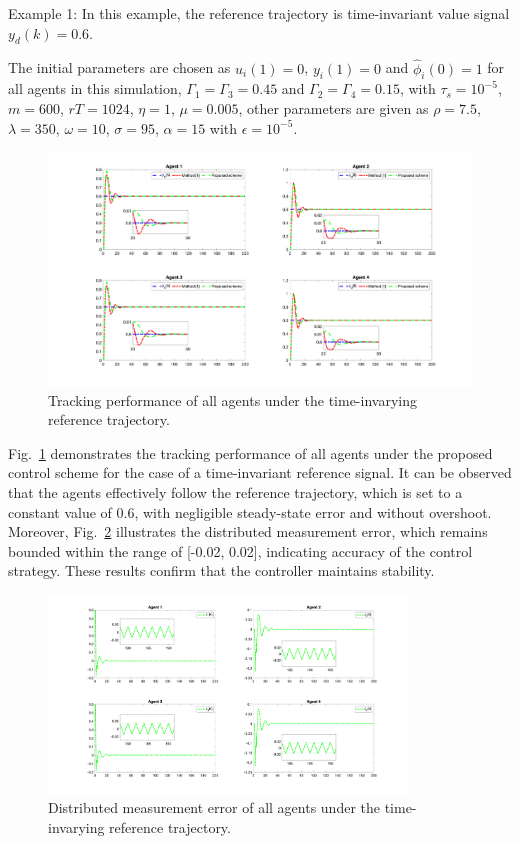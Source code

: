 \documentclass[journal,onecolumn]{IEEEtran}
\begin{document}
Example 1: In this example, the reference trajectory is time-invariant value signal $ y_d(k) = 0.6 $.



The initial parameters are chosen as \(u_i(1)=0\), \(y_i(1)=0\) and \(\hat{\phi}_i(0)=1 \) for all agents in this simulation, \(\Gamma_{1}=\Gamma_{3}=0.45\) and \(\Gamma_{2}=\Gamma_{4}=0.15\), with \(\tau_s=10^{-5}\), \(m=600\), $rT = 1024 $, \(\eta=1\), \(\mu=0.005\), other parameters are given as \(\rho=7.5\), \(\lambda=350\), $ \omega = 10 $, $ \sigma=95 $, \(\alpha=15\) with \(\epsilon=10^{-5}\).
\begin{figure}[H]
    \centering
    \includegraphics[width=0.85 \textwidth]{inv_tracking.png}
    \caption{Tracking performance of all agents under the time-invarying reference trajectory.}
    \label{fig:tracking_inv} %
\end{figure}


Fig.~\ref{fig:tracking_inv} demonstrates the tracking performance of all agents under the proposed control scheme for the case of a time-invariant reference signal. It can be observed that the agents effectively follow the reference trajectory, which is set to a constant value of 0.6, with negligible steady-state error and without overshoot.
Moreover, Fig.~\ref{fig:error_inv} illustrates the distributed measurement error, which remains bounded within the range of [-0.02, 0.02], indicating accuracy of the control strategy. These results confirm that the controller maintains stability.


\begin{figure}[H]
    \centering
    \includegraphics[width=0.85\textwidth]{inv_error.png}
    \caption{Distributed measurement error of all agents under the time-invarying reference trajectory.}
    \label{fig:error_inv} %
\end{figure}
\end{document}
